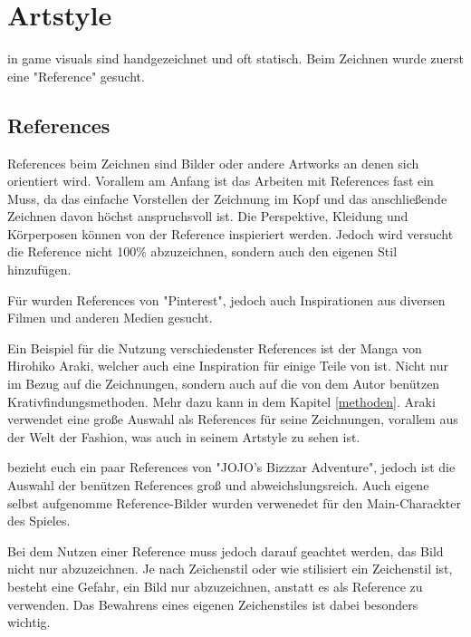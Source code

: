 
\section{Artstyle}\label{sec:artstyle}

\renewcommand{\kapitelautor}{Autor: Philip Jankovic}

\FF in game visuals sind handgezeichnet und oft statisch. Beim Zeichnen wurde zuerst eine "Reference" gesucht.


\subsection{References}\label{subsec:references}
References beim Zeichnen sind Bilder oder andere Artworks an denen sich orientiert wird. Vorallem am Anfang ist das
Arbeiten mit References fast ein Muss, da das einfache Vorstellen der Zeichnung im Kopf und das anschließende Zeichnen davon höchst anspruchsvoll ist.
Die Perspektive, Kleidung und Körperposen können von der Reference inspieriert werden.
Jedoch wird versucht die Reference nicht 100\% abzuzeichnen, sondern auch den eigenen Stil hinzufügen. 


Für \FF wurden References von "Pinterest", jedoch auch Inspirationen aus diversen Filmen und anderen Medien gesucht.%


Ein Beispiel für die Nutzung verschiedenster References ist der Manga  von Hirohiko Araki,
welcher auch eine Inspiration für einige Teile von \FF ist. Nicht nur im Bezug auf die Zeichnungen, sondern auch auf die von dem Autor benützen Krativfindungsmethoden.
Mehr dazu kann in dem Kapitel \ref{methoden}. %
Araki verwendet eine große Auswahl als References für seine Zeichnungen, vorallem aus der Welt
der Fashion, was auch in seinem Artstyle zu sehen ist.


\FF bezieht euch ein paar References von "JOJO's Bizzzar Adventure", jedoch ist die Auswahl der benützen References groß und abweichslungsreich.
Auch eigene selbst aufgenomme Reference-Bilder wurden verwenedet für \zB den Main-Charackter des Spieles.


Bei dem Nutzen einer Reference muss jedoch darauf geachtet werden, das Bild nicht nur abzuzeichnen. Je nach Zeichenstil
oder wie stilisiert ein Zeichenstil ist, besteht eine Gefahr, ein Bild nur abzuzeichnen, anstatt es als Reference zu verwenden.
Das Bewahrens eines eigenen Zeichenstiles ist dabei besonders wichtig.


